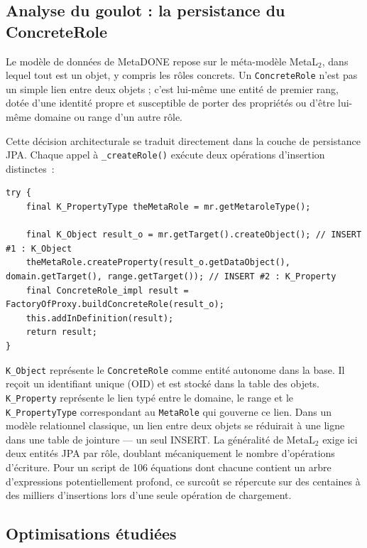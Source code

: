 \subsection{Analyse du goulot : la persistance du ConcreteRole}
Le modèle de données de MetaDONE repose sur le méta-modèle MetaL$_2$, dans lequel tout est un objet, y compris les rôles concrets. Un \texttt{ConcreteRole} n'est pas un simple lien entre deux objets ; c'est lui-même une entité de premier rang, dotée d'une identité propre et susceptible de porter des propriétés ou d'être lui-même domaine ou range d'un autre rôle.

Cette décision architecturale se traduit directement dans la couche de persistance JPA. Chaque appel à \texttt{\_createRole()} exécute deux opérations d'insertion distinctes~:
\begin{lstlisting}[firstnumber=332,
  caption={Création du rôle avec \texttt{K\_Object} et \texttt{K\_Property} ---
  méthode \texttt{ConcreteModel\_impl.\_createRole()},
  bundle \texttt{metadone\_bundle\_metabusiness}.},
  label={ls-createRole}]
try {
    final K_PropertyType theMetaRole = mr.getMetaroleType();

    final K_Object result_o = mr.getTarget().createObject(); // INSERT #1 : K_Object
    theMetaRole.createProperty(result_o.getDataObject(), domain.getTarget(), range.getTarget()); // INSERT #2 : K_Property
    final ConcreteRole_impl result = FactoryOfProxy.buildConcreteRole(result_o);
    this.addInDefinition(result);
    return result;
}
\end{lstlisting}

\texttt{K\_Object} représente le \texttt{ConcreteRole} comme entité autonome dans la base. Il reçoit un identifiant unique (OID) et est stocké dans la table des objets. \texttt{K\_Property} représente le lien typé entre le domaine, le range et le \texttt{K\_PropertyType} correspondant au \texttt{MetaRole} qui gouverne ce lien.
Dans un modèle relationnel classique, un lien entre deux objets se réduirait à une ligne dans une table de jointure --- un seul INSERT. La généralité de MetaL$_2$ exige ici deux entités JPA par rôle, doublant mécaniquement le nombre d'opérations d'écriture. Pour un script de 106 équations dont chacune contient un arbre d'expressions potentiellement profond, ce surcoût se répercute sur des centaines à des milliers d'insertions lors d'une seule opération de chargement.

\subsection{Optimisations étudiées}
\label{sec:scenario2-opti}

